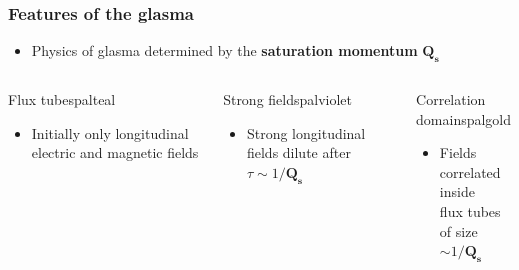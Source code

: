 \documentclass[aspectratio=169,11pt,usenames,dvipsnames]{beamer}
\begin{document}
\begin{frame}
    \frametitle{Features of the glasma}
    \begin{itemize}\itemsep0em 
        \item \begin{center}Physics of glasma determined by the {\bfseries saturation momentum} $\boldsymbol{Q_s}$\end{center}
    \end{itemize}
    \vspace{-10pt}
    \begin{columns}[onlytextwidth,t]

        \begin{custombox2}{{\normalsize Flux tubes}}{palteal}
            \begin{varwidth}{0.99\columnwidth}
            \begin{itemize}\itemsep0em 
                \scriptsize
                \item Initially only longitudinal electric and magnetic fields
            \end{itemize}
            \end{varwidth}
        \end{custombox2}

       \begin{custombox2}{{\normalsize Strong fields}}{palviolet}
            \begin{varwidth}{0.95\columnwidth}
            \begin{itemize}\itemsep0em 
                \scriptsize
                \item Strong longitudinal fields dilute after $\tau\sim 1/\boldsymbol{Q_s}$
            \end{itemize}
            \end{varwidth}
        \end{custombox2}

        \begin{custombox2}{{\normalsize Correlation domains}}{palgold}
            \begin{varwidth}{0.99\columnwidth}
            \begin{itemize}\itemsep0em 
                \scriptsize
                \item Fields correlated inside\\ flux tubes of size $\sim 1/\boldsymbol{Q_s}$ 
            \end{itemize}
            \end{varwidth}
        \end{custombox2}
 

\end{columns}
\end{frame}
\end{document}
